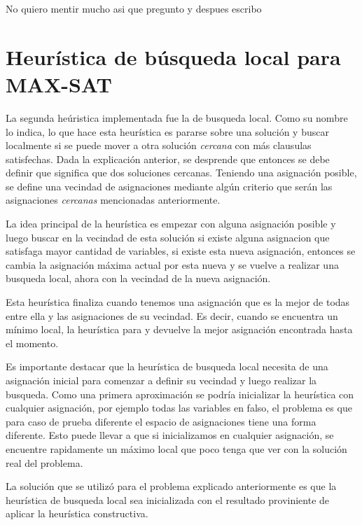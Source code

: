 \documentclass[a4paper,10pt]{article}
\begin{document}
No quiero mentir mucho asi que pregunto y despues escribo



\section*{Heur\'istica de b\'usqueda local para MAX-SAT}

La segunda he\'uristica implementada fue la de busqueda local. Como su nombre lo indica, lo que hace esta heur\'istica es pararse sobre una soluci\'on y buscar localmente si se puede mover a otra soluci\'on \emph{cercana} con m\'as clausulas satisfechas. Dada la explicaci\'on anterior, se desprende que entonces se debe definir que significa que dos soluciones cercanas. Teniendo una asignaci\'on posible, se define una vecindad de asignaciones mediante alg\'un criterio que ser\'an las asignaciones \emph{cercanas} mencionadas anteriormente.

La idea principal de la heur\'istica es empezar con alguna asignaci\'on posible y luego buscar en la vecindad de esta soluci\'on si existe alguna asignacion que satisfaga mayor cantidad de variables, si existe esta nueva asignaci\'on, entonces se cambia la asignaci\'on m\'axima actual por esta nueva y se vuelve a realizar una busqueda local, ahora con la vecindad de la nueva asignaci\'on.

Esta heur\'istica finaliza cuando tenemos una asignaci\'on que es la mejor de todas entre ella y las asignaciones de su vecindad. Es decir, cuando se encuentra un m\'inimo local, la heur\'istica para y devuelve la mejor asignaci\'on encontrada hasta el momento.

Es importante destacar que la heur\'istica de busqueda local necesita de una asignaci\'on inicial para comenzar a definir su vecindad y luego realizar la busqueda. Como una primera aproximaci\'on se podr\'ia inicializar la heur\'istica con cualquier asignaci\'on, por ejemplo todas las variables en falso, el problema es que para caso de prueba diferente el espacio de asignaciones tiene una forma diferente. Esto puede llevar a que si inicializamos en cualquier asignaci\'on, se encuentre rapidamente un m\'aximo local que poco tenga que ver con la soluci\'on real del problema. 

La soluci\'on que se utiliz\'o para el problema explicado anteriormente es que la heur\'istica de busqueda local sea inicializada con el resultado proviniente de aplicar la heur\'istica constructiva.
\end{document}
